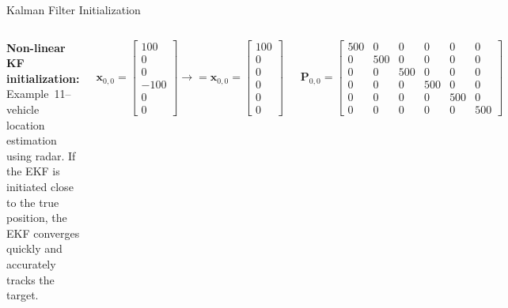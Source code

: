 \begin{frame}{Kalman Filter Initialization}
\begin{columns}
    \textbf{Non-linear KF initialization:} Example~11--vehicle location estimation using radar. If the EKF is initiated close to the true position, the EKF converges quickly and accurately tracks the target.

    \[
\bm{x}_{0,0} =
\begin{bmatrix}
100 \\
0 \\
0 \\
-100 \\
0 \\
0
\end{bmatrix} \rightarrow = \bm{x}_{0,0} =
\begin{bmatrix}
100 \\
0 \\
0 \\
0 \\
0 \\
0
\end{bmatrix}
\]

\[
\bm{P}_{0,0} =
\begin{bmatrix}
500 & 0 & 0 & 0 & 0 & 0 \\
0 & 500 & 0 & 0 & 0 & 0 \\
0 & 0 & 500 & 0 & 0 & 0 \\
0 & 0 & 0 & 500 & 0 & 0 \\
0 & 0 & 0 & 0 & 500 & 0 \\
0 & 0 & 0 & 0 & 0 & 500
\end{bmatrix}
\]


\end{columns}
\end{frame}
